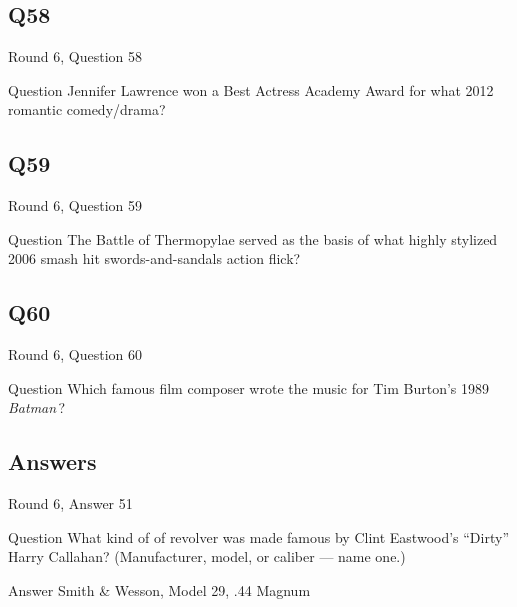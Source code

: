 \documentclass[11pt]{beamer}
\begin{document}
\subsection*{Q58}
\begin{frame}[t]{Round 6, Question 58}
\vspace{2em}
\begin{block}{Question}
Jennifer Lawrence won a Best Actress Academy Award for what 2012 romantic comedy/drama?
\end{block}
\end{frame}
    

\subsection*{Q59}
\begin{frame}[t]{Round 6, Question 59}
\vspace{2em}
\begin{block}{Question}
The Battle of Thermopylae served as the basis of what highly stylized 2006 smash hit swords-and-sandals action flick?
\end{block}
\end{frame}
    

\subsection*{Q60}
\begin{frame}[t]{Round 6, Question 60}
\vspace{2em}
\begin{block}{Question}
Which famous film composer wrote the music for Tim Burton's 1989 \emph{Batman}\,?
\end{block}
\end{frame}
    
\subsection{Answers}

\begin{frame}[t]{Round 6, Answer 51}
\vspace{2em}
\begin{block}{Question}
What kind of of revolver was made famous by Clint Eastwood's ``Dirty'' Harry Callahan? (Manufacturer, model, or caliber — name one.)
\end{block}
\pause{}
\begin{block}{Answer}
Smith \& Wesson, Model 29, .44 Magnum
\end{block}
\end{frame}
    
\end{document}
